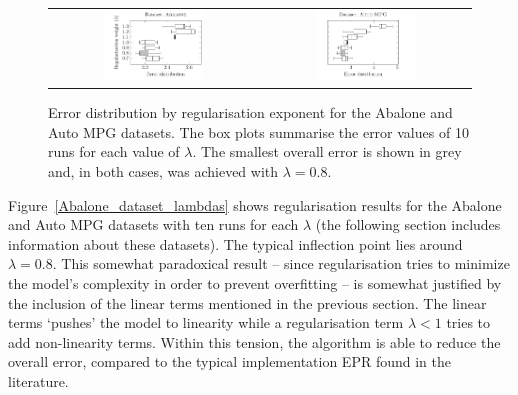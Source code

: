 \documentclass[preprint,authoryear,12pt]{elsarticle}
\begin{document}
\begin{figure}[tb]\begin{center}
\begin{tabular}{cc}
\includegraphics[width=0.49\textwidth]{figure_1a.pdf}
%
&
%
%
\includegraphics[width=0.49\textwidth]{figure_1b.pdf}
\end{tabular}

\caption{Error distribution by regularisation exponent for the Abalone and Auto MPG datasets. The box plots summarise the error values of 10 runs for each value of $\lambda$. The smallest overall error is shown in grey and, in both cases, was achieved with $\lambda=0.8$.}
\label{Abalone_dataset_lambdas}\label{Auto-MPG_dataset_lambdas}

\end{center}\end{figure}

Figure~\ref{Abalone_dataset_lambdas} shows regularisation results for the Abalone and Auto MPG datasets with ten runs for each $\lambda$ (the following section  includes information about these datasets). The typical inflection point lies around $\lambda = 0.8$. This somewhat paradoxical result -- since regularisation tries to minimize the model's complexity in order to prevent overfitting -- is somewhat justified by the inclusion of the linear terms mentioned in the previous section. The linear terms `pushes' the model to linearity while a regularisation term $\lambda < 1$ tries to add non-linearity terms. Within this tension, the algorithm is able to reduce the overall error, compared to the typical implementation \ac{EPR} found in the literature.
\end{document}
